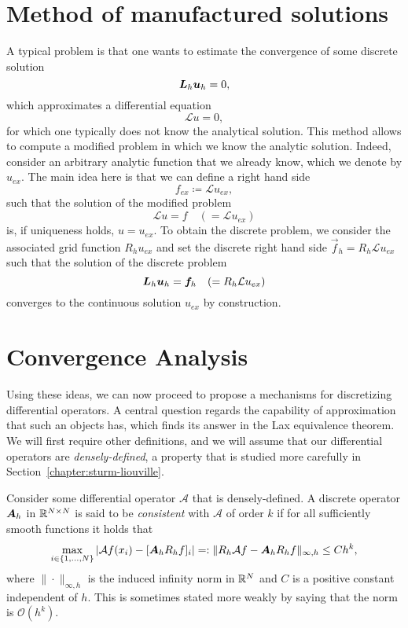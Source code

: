 \section{Method of manufactured solutions}
A typical problem is that one wants to estimate the convergence of some discrete solution
    \begin{equation}
\mat L_h \vec u_h = 0,
\end{equation}
which approximates a differential equation
    \begin{equation}
\mathcal L u = 0,
\end{equation}
for which one typically does not know the analytical solution. This method allows to compute a modified problem in which we know the analytic solution. Indeed, consider an arbitrary analytic function that we already know, which we denote by $u_{ex}$. The main idea here is that we can define a right hand side 
    \begin{equation}
f_{ex} \coloneqq \mathcal L u_{ex},
\end{equation}
such that the solution of the modified problem 
    \begin{equation}
\mathcal L u = f \quad ( = \mathcal L u_{ex})
\end{equation}
    is, if uniqueness holds, $u = u_{ex}$. To obtain the discrete problem, we consider the associated grid function $R_h u_{ex}$ and set the discrete right hand side $\vec f_h = R_h \mathcal L u_{ex}$ such that the solution of the discrete problem 
    \begin{equation}
\mat L_h \vec u_h = \vec f_h \quad (=R_h \mathcal L u_{ex})
\end{equation}
converges to the continuous solution $u_{ex}$ by construction. 

\section{Convergence Analysis}
Using these ideas, we can now proceed to propose a mechanisms for discretizing differential operators. A central question regards the capability of approximation that such an objects has, which finds its answer in the Lax equivalence theorem. We will first require other definitions, and we will assume that our differential operators are \emph{densely-defined}, a property that is studied more carefully in Section~\ref{chapter:sturm-liouville}.

\begin{definition}[Consistency]
    Consider some differential operator $\mathcal A$ that is densely-defined. A discrete operator $\mat A_h$ in $\mathbb{R}^{N\times N}$ is said to be \emph{consistent} with $\mathcal A$ of order $k$ if for all sufficiently smooth functions it holds that
    \begin{equation}\label{def:consistency}
        \max_{i\in\{1,\hdots,N\}}|\mathcal Af(x_i) - [\mat A_hR_hf]_i| =: \|R_h \mathcal Af - \mat A_hR_h f\|_{\infty,h} \leq C h^k,
    \end{equation}
    where $\|\cdot \|_{\infty,h}$ is the induced infinity norm in $\mathbb{R}^N$ and $C$ is a positive constant independent of $h$. This is sometimes stated more weakly by saying that the norm is $\mathcal O(h^k)$. 
\end{definition}

